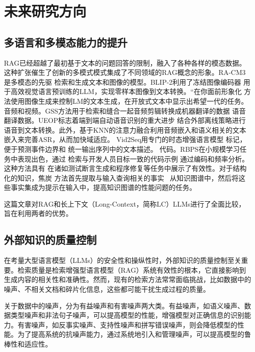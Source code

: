 \chapter{未来研究方向}

\section{多语言和多模态能力的提升}
RAG已经超越了最初基于文本的问题回答的限制，融入了各种各样的模态数据。
这种扩张催生了创新的多模式模式集成了不同领域的RAG概念的形象\cite{gao2024retrievalaugmentedgenerationlargelanguage}。RA-CM3\cite{yasunaga2023retrievalaugmentedmultimodallanguagemodeling}是多模态的先驱
检索和生成文本和图像的模型。BLIP-2\cite{li2023blip}利用了冻结图像编码器
用于高效视觉语言预训练的LLM，实现零样本图像到文本转换。“在你面前形象化
方法\cite{zhu2022visualize}使用图像生成来控制LM的文本生成，在开放式文本中显示出希望一代的任务。
音频和视频。GSS方法用于检索和缝合一起音频剪辑转换成机器翻译的数据
语音翻译数据\cite{zhao2022generating}。UEOP标志着端到端自动语音识别的重大进步
结合外部离线策略进行语音到文本转换\cite{chan2023using}。此外，基于KNN的注意力融合利用音频嵌入和语义相关的文本嵌入来完善ASR，从而加快域适应。
Vid2Seq用专门的时态增强语言模型
标记，便于预测事件边界和
统一输出序列中的文本描述\cite{yang2023vid2seq}。
代码。RBPS\cite{nashid2023retrieval}在小规模学习任务中表现出色，通过
检索与开发人员目标一致的代码示例
通过编码和频率分析。这种方法具有
在诸如测试断言生成和程序修复等任务中展示了有效性。对于结构化的知识，焦炭
方法\cite{li2023chain}首先提取与输入查询相关的事实
\
从知识图谱中，然后将这些事实集成为提示在输入中，提高知识图谱的性能问题的任务\cite{peng2024graphretrievalaugmentedgenerationsurvey}。

这篇文章\cite{li2024retrievalaugmentedgenerationlongcontext}对RAG和长上下文（Long-Context，简称LC）LLMs进行了全面比较，旨在利用两者的优势。
\section{外部知识的质量控制}

在考量大型语言模型（LLMs）的安全性和操纵性时，外部知识的质量控制至关重要。检索质量是检索增强型语言模型（RAG）系统有效性的根本，它直接影响到生成内容的相关性和准确性。然而，现有的检索方法常常面临挑战，比如数据中的噪声、不相关文档和碎片化信息，这些都可能干扰生成过程的质量。

关于数据中的噪声，分为有益噪声和有害噪声两大类。有益噪声，如语义噪声、数据类型噪声和非法句子噪声，可以提高模型的性能，增强模型对正确信息的识别能力。有害噪声，如反事实噪声、支持性噪声和拼写错误噪声，则会降低模型的性能。为了提高系统的抗噪声能力，通过系统地引入和管理噪声，可以提高模型的鲁棒性和适应性。

